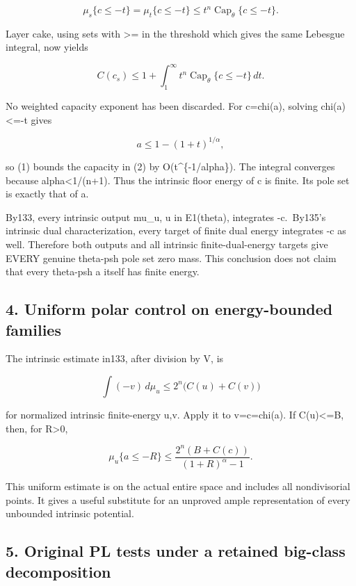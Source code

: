 \documentclass[
  10pt,
]{article}
\begin{document}
\[\mu_s\{c\leq-t\}=\mu_t\{c\leq-t\}
\leq t^n\operatorname{Cap}_\theta\{c\leq-t\}.\]

Layer cake, using sets with \textgreater= in the threshold which gives
the same Lebesgue integral, now yields

\[C(c_s)\leq1+\int_1^\infty t^n\operatorname{Cap}_\theta\{c\leq-t\}\,dt.\tag{2}\]

No weighted capacity exponent has been discarded. For c=chi(a), solving
chi(a)\textless=-t gives

\[a\leq1-(1+t)^{1/\alpha},\]

so (1) bounds the capacity in (2) by O(t\^{}\{-1/alpha\}). The integral
converges because alpha\textless1/(n+1). Thus the intrinsic floor energy
of c is finite. Its pole set is exactly that of a.

By133, every intrinsic output mu\_u, u in E1(theta), integrates
-c.~By135's intrinsic dual characterization, every target of finite dual
energy integrates -c as well. Therefore both outputs and all intrinsic
finite-dual-energy targets give EVERY genuine theta-psh pole set zero
mass. This conclusion does not claim that every theta-psh a itself has
finite energy.

\subsection{4. Uniform polar control on energy-bounded
families}\label{uniform-polar-control-on-energy-bounded-families}

The intrinsic estimate in133, after division by V, is

\[\int(-v)\,d\mu_u\leq2^n\bigl(C(u)+C(v)\bigr)\]

for normalized intrinsic finite-energy u,v. Apply it to v=c=chi(a). If
C(u)\textless=B, then, for R\textgreater0,

\[\mu_u\{a\leq-R\}\leq
\frac{2^n(B+C(c))}{(1+R)^\alpha-1}.\tag{3}\]

This uniform estimate is on the actual entire space and includes all
nondivisorial points. It gives a useful substitute for an unproved ample
representation of every unbounded intrinsic potential.

\subsection{5. Original PL tests under a retained big-class
decomposition}\label{original-pl-tests-under-a-retained-big-class-decomposition}
\end{document}
